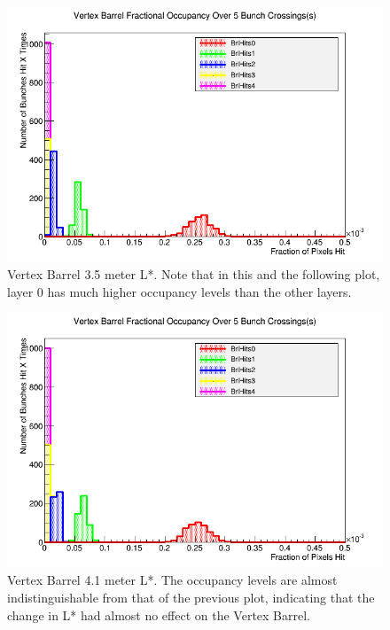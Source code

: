 \documentclass{report}
\begin{document}
                \begin{figure}[H]
                    \includegraphics[height=.4\textheight]{Voccupancy_sidloi3_IR_realign_preqd0shift_5B_ps30_1510212229_brl}
                    \centering
                    \caption{Vertex Barrel 3.5 meter L*. Note that in this and the following plot,
                            layer 0 has much higher occupancy levels than the other layers.}
                    \label{fig__lstar_vertex_brl_3.5}
                \end{figure}
                \begin{figure}[H]
                    \includegraphics[height=.4\textheight]{Voccupancy_sidloi3_IR_realign_5B_ps30_1510211229_brl}
                    \centering
                    \caption{Vertex Barrel 4.1 meter L*. The occupancy levels are almost 
                            indistinguishable from that of the previous plot, indicating 
                            that the change in L* had almost no effect on the Vertex Barrel.}
                    \label{fig__lstar_vertex_brl_4.1}
                \end{figure}
\end{document}
